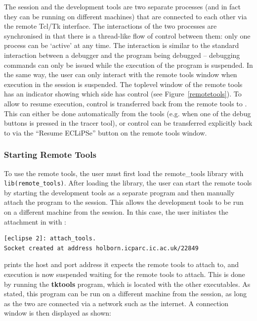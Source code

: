The {\eclipse} session and the development tools are two separate processes
(and in fact they can be running on different machines) that are connected
to each other via the remote Tcl/Tk interface. The interactions of the two
processes are synchronised in that there is a thread-like flow of control
between them: only one process can be `active' at any time. The interaction
is similar to the standard interaction between a debugger and the program
being debugged -- debugging commands can only be issued
while the execution of the program is suspended. In the same way, the user
can only interact with the remote tools window when execution in the
{\eclipse} session is suspended. The toplevel window of the remote tools
has an indicator showing which side has control (see Figure~\ref{remotetools}).
To allow {\eclipse} to resume execution, control is transferred back from
the remote tools to {\eclipse}. This can either be
done automatically from the tools (e.g. when one of the debug buttons is
pressed in the tracer tool), or control can be transferred explicitly back
to {\eclipse} via the ``Resume ECLiPSe'' button on the remote tools window.


\subsubsection{Starting Remote Tools}

To use the remote tools, the user must first load the remote_tools library
with \verb'lib(remote_tools)'. After loading the library, the user can
start the remote tools by
starting the development tools as a separate program and then manually
attach the program to the {\eclipse} session. This allows the development
tools to be run on a different machine from the {\eclipse} session. In this
case, the user initiates the attachment in {\eclipse} with
:

\begin{verbatim}
[eclipse 2]: attach_tools.
Socket created at address holborn.icparc.ic.ac.uk/22849

\end{verbatim}

{\eclipse} prints the host and port address it expects the remote tools to
attach to, and execution is now suspended waiting for the remote tools to
attach. This is done by running the {\bf tktools} program, which is located
with the other {\eclipse} executables. As stated, this program can be run
on a different machine from the {\eclipse} session, as long as the two are
connected via a network such as the internet. A connection window is then
displayed as shown:

